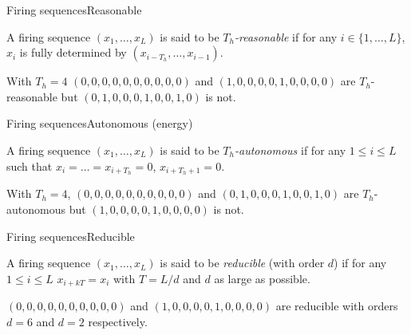 \documentclass{beamer}
\begin{document}
	\begin{frame}{Firing sequences}{Reasonable}
		\justifying
		\begin{definition}
			\justifying
			A firing sequence $(x_1, \dots, x_L)$ is said to be \emph{$T_h$-reasonable} if for any $i \in \{1, \dots, L\}$, $x_i$ is fully determined by $(x_{i-T_h}, \dots, x_{i-1})$.
		\end{definition}

		\begin{example}
			\justifying
			With $T_h= 4$ $(0, 0, 0, 0, 0, 0, 0, 0, 0, 0)$ and $(1, 0, 0, 0, 0, 1, 0, 0, 0, 0)$ are $T_h$-reasonable but $(0, 1, 0, 0, 0, 1, 0, 0, 1, 0)$ is not.
		\end{example}
	\end{frame}

	\begin{frame}{Firing sequences}{Autonomous (energy)}
		\justifying
		\begin{definition}
			\justifying
			A firing sequence $(x_1, \dots, x_L)$ is said to be \emph{$T_h$-autonomous} if for any $1 \leq i \leq L$ such that $x_i = \dots = x_{i+T_h} = 0$, $x_{i+T_h + 1} = 0$.
		\end{definition}

		\begin{example}
			\justifying
			With $T_h= 4$, $(0, 0, 0, 0, 0, 0, 0, 0, 0, 0)$ and $(0, 1, 0, 0, 0, 1, 0, 0, 1, 0)$ are $T_h$-autonomous but $(1, 0, 0, 0, 0, 1, 0, 0, 0, 0)$ is not.
		\end{example}
	\end{frame}

	\begin{frame}{Firing sequences}{Reducible}
		\justifying
		\begin{definition}
			\justifying
			A firing sequence $(x_1, \dots, x_L)$ is said to be \emph{reducible} (with order $d$) if for any $1 \leq i \leq L$ $x_{i+kT} = x_{i}$ with $T = L/d$ and $d$ as large as possible.
		\end{definition}

		\begin{example}
			\justifying
			$(0, 0, 0, 0, 0, 0, 0, 0, 0, 0)$ and $(1, 0, 0, 0, 0, 1, 0, 0, 0, 0)$ are reducible with orders $d=6$ and $d=2$ respectively.
		\end{example}
	\end{frame}
\end{document}
